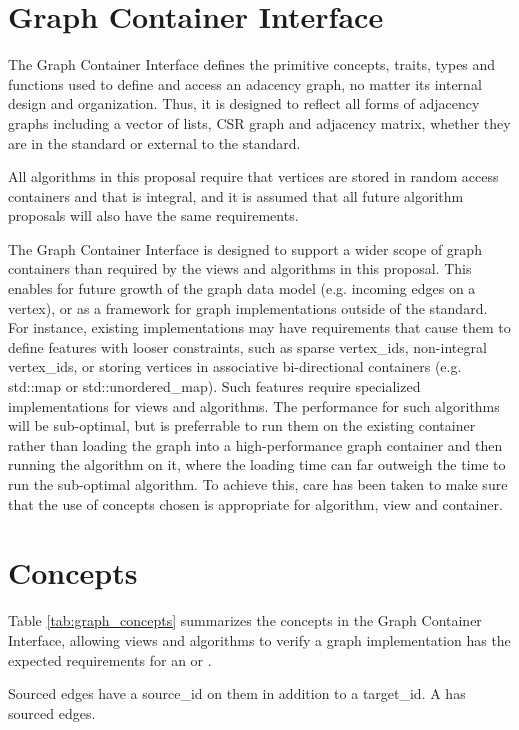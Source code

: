 
\section{Graph Container Interface}
The Graph Container Interface defines the primitive concepts, traits, types and functions used to define and access an adacency graph, no matter its internal design and organization. Thus, it is designed to reflect all forms of adjacency graphs including a vector of lists, CSR graph and adjacency matrix, whether they are in the standard or external to the standard.

All algorithms in this proposal require that vertices are stored in random access containers and that  is integral, and it is assumed that all future algorithm proposals will also have the same requirements. 

The Graph Container Interface is designed to support a wider scope of graph containers than required by the views and algorithms in this proposal. This enables for future growth of the graph data model (e.g. incoming edges on a vertex), or as a framework for graph implementations outside of the standard. For instance, existing implementations may have requirements that cause them to define features with looser constraints, such as sparse vertex\_ids, non-integral vertex\_ids, or storing vertices in associative bi-directional containers (e.g. std::map or std::unordered\_map). Such features require specialized implementations for views and algorithms. The performance for such algorithms will be sub-optimal, but is preferrable to run them on the existing container rather than loading the graph into a high-performance graph container and then running the algorithm on it, where the loading time can far outweigh the time to run the sub-optimal algorithm. To achieve this, care has been taken to make sure that the use of concepts chosen is appropriate for algorithm, view and container.

\section{Concepts}
Table \ref{tab:graph_concepts} summarizes the concepts in the Graph Container Interface, allowing views and algorithms to verify a graph implementation has the expected requirements for an  or .

Sourced edges have a source\_id on them in addition to a target\_id. A  has sourced edges.

